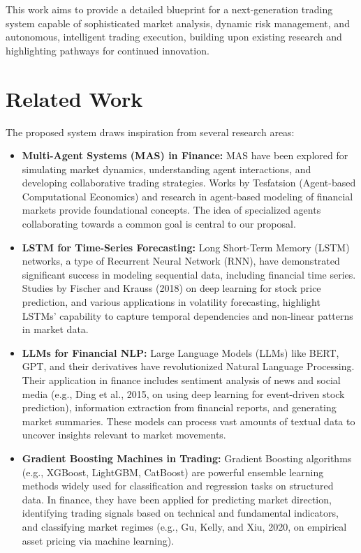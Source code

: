 \documentclass[11pt,a4paper]{article}
\begin{document}
This work aims to provide a detailed blueprint for a next-generation trading system capable of sophisticated market analysis, dynamic risk management, and autonomous, intelligent trading execution, building upon existing research and highlighting pathways for continued innovation.

\section{Related Work}

The proposed system draws inspiration from several research areas:

\begin{itemize}
\item   \textbf{Multi-Agent Systems (MAS) in Finance:} MAS have been explored for simulating market dynamics, understanding agent interactions, and developing collaborative trading strategies. Works by Tesfatsion (Agent-based Computational Economics) and research in agent-based modeling of financial markets provide foundational concepts. The idea of specialized agents collaborating towards a common goal is central to our proposal.

\item   \textbf{LSTM for Time-Series Forecasting:} Long Short-Term Memory (LSTM) networks, a type of Recurrent Neural Network (RNN), have demonstrated significant success in modeling sequential data, including financial time series. Studies by Fischer and Krauss (2018) on deep learning for stock price prediction, and various applications in volatility forecasting, highlight LSTMs' capability to capture temporal dependencies and non-linear patterns in market data.

\item   \textbf{LLMs for Financial NLP:} Large Language Models (LLMs) like BERT, GPT, and their derivatives have revolutionized Natural Language Processing. Their application in finance includes sentiment analysis of news and social media (e.g., Ding et al., 2015, on using deep learning for event-driven stock prediction), information extraction from financial reports, and generating market summaries. These models can process vast amounts of textual data to uncover insights relevant to market movements.

\item   \textbf{Gradient Boosting Machines in Trading:} Gradient Boosting algorithms (e.g., XGBoost, LightGBM, CatBoost) are powerful ensemble learning methods widely used for classification and regression tasks on structured data. In finance, they have been applied for predicting market direction, identifying trading signals based on technical and fundamental indicators, and classifying market regimes (e.g., Gu, Kelly, and Xiu, 2020, on empirical asset pricing via machine learning).


\end{itemize}
\end{document}
